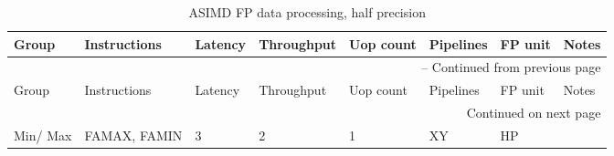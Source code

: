 \newpage
\begin{longtable}{|p{1in}|p{1in}|l|l|l|p{1in}|l|p{1in}|}
\caption{ASIMD FP data processing, half precision} \\
\hline
Group & Instructions & Latency & Throughput & Uop count & Pipelines & FP unit & Notes\\
\hline
\endfirsthead
\hline
\multicolumn{8}{|r|}{{\tablename\ \thetable{} -- Continued from previous page}} \\
\hline
Group & Instructions & Latency & Throughput & Uop count & Pipelines & FP unit & Notes\\
\hline
\endhead
\hline
\multicolumn{8}{|r|}{{Continued on next page}} \\
\hline
\endfoot
\hline
\endlastfoot
Min/ Max & FAMAX, FAMIN & 3 & 2 & 1 & XY & HP & \\
\hline
\end{longtable}
\newpage
